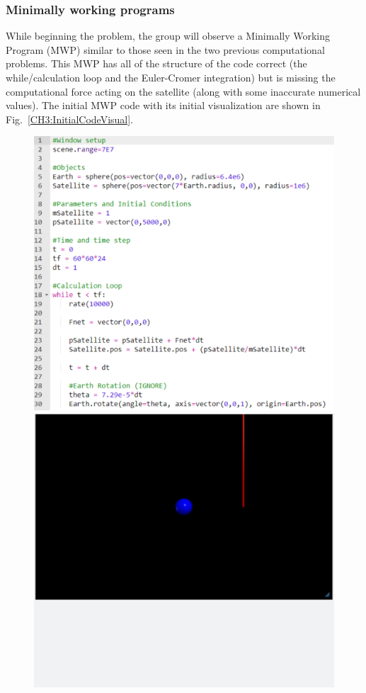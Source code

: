 \documentclass{msuphddissertation}
\begin{document}
\begin{doublespace}
\subsubsection{Minimally working programs}

While beginning the problem, the group will observe a Minimally Working Program (MWP) similar to those seen in the two previous computational problems.  This MWP has all of the structure of the code correct (the while/calculation loop and the Euler-Cromer integration) but is missing the computational force acting on the satellite (along with some inaccurate numerical values).  The initial MWP code with its initial visualization are shown in Fig.~\ref{CH3:InitialCodeVisual}.

\begin{figure}[ht]\centering
\includegraphics[scale=0.40]{images/CH3InitialCode.pdf}\includegraphics[scale=0.40]{images/CH3InitialVisual.pdf}

\end{figure}
\end{doublespace}
\end{document}
